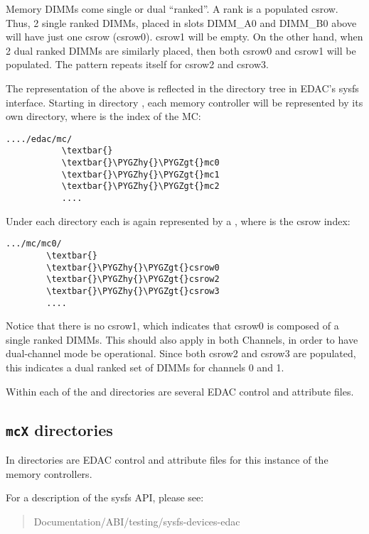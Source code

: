 \documentclass[a4paper,8pt,english]{sphinxmanual}
\def\PYGZgt{\char`\>}
\def\PYGZhy{\char`\-}
\begin{document}
Memory DIMMs come single or dual ``ranked''. A rank is a populated csrow.
Thus, 2 single ranked DIMMs, placed in slots DIMM\_A0 and DIMM\_B0 above
will have just one csrow (csrow0). csrow1 will be empty. On the other
hand, when 2 dual ranked DIMMs are similarly placed, then both csrow0
and csrow1 will be populated. The pattern repeats itself for csrow2 and
csrow3.

The representation of the above is reflected in the directory
tree in EDAC's sysfs interface. Starting in directory
, each memory controller will be
represented by its own  directory, where  is the
index of the MC:

\begin{Verbatim}[commandchars=\\\{\}]
..../edac/mc/
           \textbar{}
           \textbar{}\PYGZhy{}\PYGZgt{}mc0
           \textbar{}\PYGZhy{}\PYGZgt{}mc1
           \textbar{}\PYGZhy{}\PYGZgt{}mc2
           ....
\end{Verbatim}

Under each  directory each  is again represented by a
, where  is the csrow index:

\begin{Verbatim}[commandchars=\\\{\}]
.../mc/mc0/
        \textbar{}
        \textbar{}\PYGZhy{}\PYGZgt{}csrow0
        \textbar{}\PYGZhy{}\PYGZgt{}csrow2
        \textbar{}\PYGZhy{}\PYGZgt{}csrow3
        ....
\end{Verbatim}

Notice that there is no csrow1, which indicates that csrow0 is composed
of a single ranked DIMMs. This should also apply in both Channels, in
order to have dual-channel mode be operational. Since both csrow2 and
csrow3 are populated, this indicates a dual ranked set of DIMMs for
channels 0 and 1.

Within each of the  and  directories are several EDAC
control and attribute files.


\subsection{\texttt{mcX} directories}
\label{admin-guide/ras:mcx-directories}
In  directories are EDAC control and attribute files for
this  instance of the memory controllers.

For a description of the sysfs API, please see:
\begin{quote}

Documentation/ABI/testing/sysfs-devices-edac
\end{quote}
\end{document}
